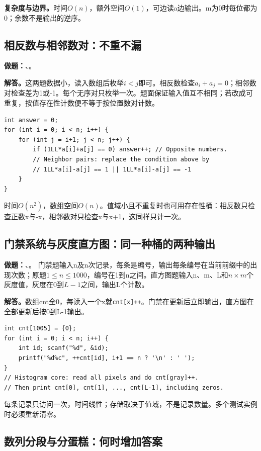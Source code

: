 \noindent\textbf{复杂度与边界。}时间$O(n)$，额外空间$O(1)$，可边读a边输出。m为0时每位都为0；余数不是输出的逆序。
\subsection{相反数与相邻数对：不重不漏}

\noindent\textbf{做题：}、。

\noindent\textbf{解答。}这两题数据小，读入数组后枚举$i<j$即可。相反数检查$a_i+a_j=0$；相邻数对检查差为1或-1。每个无序对只枚举一次。题面保证输入值互不相同；若改成可重复，按值存在性计数便不等于按位置数对计数。
\begin{lstlisting}
int answer = 0;
for (int i = 0; i < n; i++) {
    for (int j = i+1; j < n; j++) {
        if (1LL*a[i]+a[j] == 0) answer++; // Opposite numbers.
        // Neighbor pairs: replace the condition above by
        // 1LL*a[i]-a[j] == 1 || 1LL*a[i]-a[j] == -1
    }
}
\end{lstlisting}
时间$O(n^2)$，数组空间$O(n)$。值域小且不重复时也可用存在性桶：相反数只检查正数x与-x，相邻数对只检查x与x+1，这同样只计一次。
\subsection{门禁系统与灰度直方图：同一种桶的两种输出}

\noindent\textbf{做题：}、。
门禁题输入n及n次记录，每条是编号，输出每条编号在当前前缀中的出现次数；原题$1\le n\le1000$，编号在1到n之间。直方图题输入n、m、L和$n\times m$个灰度值，灰度在0到$L-1$之间，输出L个计数。

\noindent\textbf{解答。}数组cnt全0，每读入一个x就\texttt{cnt[x]++}。门禁在更新后立即输出，直方图在全部更新后按0到L-1输出。
\begin{lstlisting}
int cnt[1005] = {0};
for (int i = 0; i < n; i++) {
    int id; scanf("%d", &id);
    printf("%d%c", ++cnt[id], i+1 == n ? '\n' : ' ');
}
// Histogram core: read all pixels and do cnt[gray]++.
// Then print cnt[0], cnt[1], ..., cnt[L-1], including zeros.
\end{lstlisting}
每条记录只访问一次，时间线性；存储取决于值域，不是记录数量。多个测试实例时必须重新清零。
\subsection{数列分段与分蛋糕：何时增加答案}

